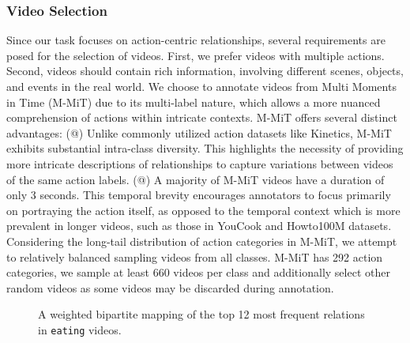 \documentclass[letterpaper]{article}
\makeatletter
\newcommand{\Rmnum}[1]{\expandafter\@slowromancap\romannumeral #1@}
\makeatother
\begin{document}
\subsubsection{Video Selection}
Since our task focuses on action-centric relationships, several requirements are posed for the selection of videos.
First, we prefer videos with multiple actions. Second, videos should contain rich information, involving different scenes, objects, and events in the real world.
We choose to annotate videos from Multi Moments in Time (M-MiT) \cite{9609554} due to its multi-label nature, which allows a more nuanced comprehension of actions within intricate contexts.
M-MiT offers several distinct advantages:
(\Rmnum{1}) Unlike commonly utilized action datasets like Kinetics, M-MiT exhibits substantial intra-class diversity. This highlights the necessity of providing more intricate descriptions of relationships to capture variations between videos of the same action labels.
(\Rmnum{2}) A majority of M-MiT videos have a duration of only 3 seconds. This temporal brevity encourages annotators to focus primarily on portraying the action itself, as opposed to the temporal context which is more prevalent in longer videos, such as those in YouCook and Howto100M datasets.
Considering the long-tail distribution of action categories in M-MiT, we attempt to relatively balanced sampling videos from all classes. M-MiT has 292 action categories, we sample at least 660 videos per class and additionally select other random videos as some videos may be discarded during annotation.
\begin{figure}[t]
  \centering
  \caption{A weighted bipartite mapping of the top 12 most frequent relations in \texttt{eating} videos.}
   \label{fig:sanki}
\end{figure}
\end{document}
